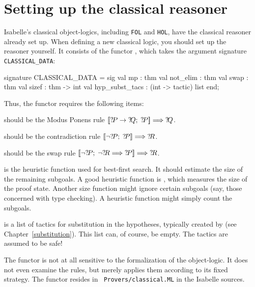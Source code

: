 \section{Setting up the classical reasoner}\label{sec:classical-setup}
Isabelle's classical object-logics, including \texttt{FOL} and \texttt{HOL}, 
have the classical reasoner already set up.  
When defining a new classical logic, you should set up the reasoner yourself.  
It consists of the \ML{} functor , which takes the 
argument signature \texttt{CLASSICAL_DATA}:
\begin{ttbox} 
signature CLASSICAL_DATA =
  sig
  val mp             : thm
  val not_elim       : thm
  val swap           : thm
  val sizef          : thm -> int
  val hyp_subst_tacs : (int -> tactic) list
  end;
\end{ttbox}
Thus, the functor requires the following items:
\begin{ttdescription}
\item[\tdxbold{mp}] should be the Modus Ponens rule
$\mathopen{[\![}{?\!P}\rightarrow{?\!Q};\; {?\!P}\mathclose{]\!]} \Longrightarrow {?\!Q}$.

\item[\tdxbold{not_elim}] should be the contradiction rule
$\mathopen{[\![}\neg{?\!P};\; {?\!P}\mathclose{]\!]} \Longrightarrow {?\!R}$.

\item[\tdxbold{swap}] should be the swap rule
$\mathopen{[\![}\neg {?\!P}; \; \neg {?\!R}\Longrightarrow {?\!P}\mathclose{]\!]} \Longrightarrow {?\!R}$.

\item[\ttindexbold{sizef}] is the heuristic function used for best-first
search.  It should estimate the size of the remaining subgoals.  A good
heuristic function is , which measures the size of the
proof state.  Another size function might ignore certain subgoals (say,
those concerned with type checking).  A heuristic function might simply
count the subgoals.

\item[\ttindexbold{hyp_subst_tacs}] is a list of tactics for substitution in
the hypotheses, typically created by  (see
Chapter~\ref{substitution}).  This list can, of course, be empty.  The
tactics are assumed to be safe!
\end{ttdescription}
The functor is not at all sensitive to the formalization of the
object-logic.  It does not even examine the rules, but merely applies
them according to its fixed strategy.  The functor resides in {\tt
  Provers/classical.ML} in the Isabelle sources.

